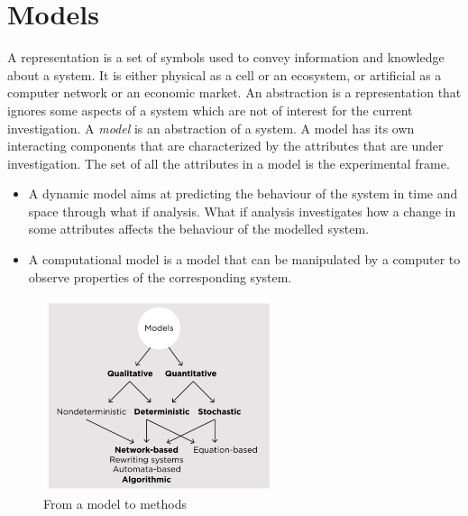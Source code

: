 \section{Models}
A representation is a set of symbols used to convey information and knowledge about a system.
It is either physical as a cell or an ecosystem, or artificial as a computer network or an economic market.
An abstraction is a representation that ignores some aspects of a system which are not of interest for the current investigation.
A \emph{model} is an abstraction of a system.
A model has its own interacting components that are characterized by the attributes that are under investigation.
The set of all the attributes in a model is the experimental frame.

\begin{multicols}{2}
  \begin{itemize}
    \item A dynamic model aims at predicting the behaviour of the system in time and space through what if analysis.
      What if analysis investigates how a change in some attributes affects the behaviour of the modelled system.
    \item A computational model is a model that can be manipulated by a computer to observe properties of the corresponding system.
  \end{itemize}
\end{multicols}

\begin{figure}[H]
  \centering
  \includegraphics[width=0.6\textwidth]{scheme_model.png}
  \caption{From a model to methods}
\end{figure}


